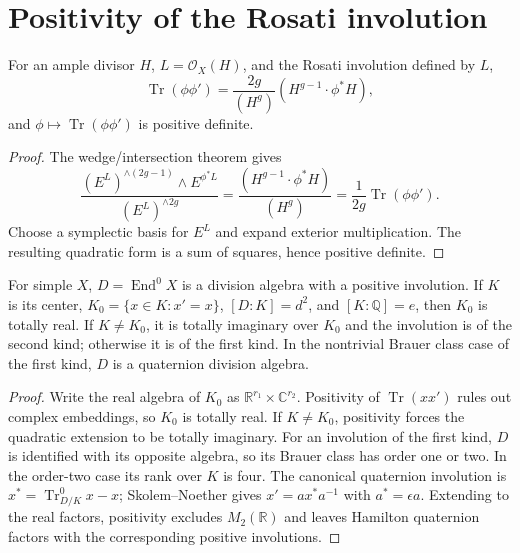 \section{Positivity of the Rosati involution}
\label{mumford-IV21-source}

\begin{theorem}
\label{mumford-thm-rosati-positive}
For an ample divisor $H$, $L=\mathcal O_X(H)$, and the Rosati involution
defined by $L$,
\[
\operatorname{Tr}(\phi\phi')
=\frac{2g}{(H^g)}(H^{g-1}\cdot\phi^*H),
\]
and $\phi\mapsto\operatorname{Tr}(\phi\phi')$ is positive definite.
\end{theorem}
\begin{proof}
The wedge/intersection theorem gives
\[
\frac{(E^L)^{\wedge(2g-1)}\wedge E^{\phi^*L}}
     {(E^L)^{\wedge2g}}
=\frac{(H^{g-1}\cdot\phi^*H)}{(H^g)}
=\frac1{2g}\operatorname{Tr}(\phi\phi').
\]
Choose a symplectic basis for $E^L$ and expand exterior multiplication. The
resulting quadratic form is a sum of squares, hence positive definite.
\end{proof}

\begin{proposition}
\label{mumford-prop-simple-endomorphism-classification}
For simple $X$, $D=\operatorname{End}^0X$ is a division algebra with a
positive involution. If $K$ is its center, $K_0=\{x\in K:x'=x\}$,
$[D:K]=d^2$, and $[K:\mathbb Q]=e$, then $K_0$ is totally real. If
$K\ne K_0$, it is totally imaginary over $K_0$ and the involution is of the
second kind; otherwise it is of the first kind. In the nontrivial Brauer
class case of the first kind, $D$ is a quaternion division algebra.
\end{proposition}
\begin{proof}
Write the real algebra of $K_0$ as
$\mathbb R^{r_1}\times\mathbb C^{r_2}$. Positivity of
$\operatorname{Tr}(xx')$ rules out complex embeddings, so $K_0$ is totally
real. If $K\ne K_0$, positivity forces the quadratic extension to be
totally imaginary. For an involution of the first kind, $D$ is identified
with its opposite algebra, so its Brauer class has order one or two. In the
order-two case its rank over $K$ is four. The canonical quaternion
involution is $x^*=\operatorname{Tr}^0_{D/K}x-x$; Skolem--Noether gives
$x'=ax^*a^{-1}$ with $a^*=\epsilon a$. Extending to the real factors,
positivity excludes $M_2(\mathbb R)$ and leaves Hamilton quaternion factors
with the corresponding positive involutions.
\end{proof}
